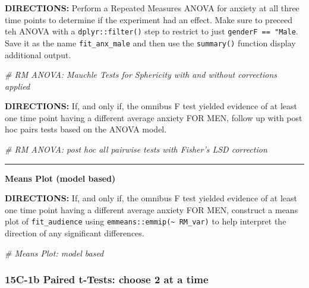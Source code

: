\documentclass[]{article}
\newenvironment{Shaded}{\begin{snugshade}}{\end{snugshade}}
\newcommand{\CommentTok}[1]{\textcolor[rgb]{0.56,0.35,0.01}{\textit{#1}}}
\begin{document}
\textbf{DIRECTIONS:} Perform a Repeated Measures ANOVA for anxiety at
all three time points to determine if the experiment had an effect. Make
sure to preceed teh ANOVA with a \texttt{dplyr::filter()} step to
restrict to just \texttt{genderF\ ==\ "Male}. Save it as the name
\texttt{fit\_anx\_male} and then use the \texttt{summary()} function
display additional output.

\begin{Shaded}
\begin{Highlighting}[]
\CommentTok{# RM ANOVA: Mauchle Tests for Sphericity with and without corrections applied}
\end{Highlighting}
\end{Shaded}

\clearpage

\textbf{DIRECTIONS:} If, and only if, the omnibus F test yielded
evidence of at least one time point having a different average anxiety
FOR MEN, follow up with post hoc pairs tests based on the ANOVA model.

\begin{Shaded}
\begin{Highlighting}[]
\CommentTok{# RM ANOVA: post hoc all pairwise tests with Fisher's LSD correction}
\end{Highlighting}
\end{Shaded}

\begin{center}\rule{0.5\linewidth}{\linethickness}\end{center}

\textbf{Means Plot (model based)}

\textbf{DIRECTIONS:} If, and only if, the omnibus F test yielded
evidence of at least one time point having a different average anxiety
FOR MEN, construct a means plot of \texttt{fit\_audience} using
\texttt{emmeans::emmip(\textasciitilde{}\ RM\_var)} to help interpret
the direction of any significant differences.

\begin{Shaded}
\begin{Highlighting}[]
\CommentTok{# Means Plot: model based}
\end{Highlighting}
\end{Shaded}

\clearpage

\subsubsection{15C-1b Paired t-Tests: choose 2 at a
time}\label{c-1b-paired-t-tests-choose-2-at-a-time}
\end{document}

